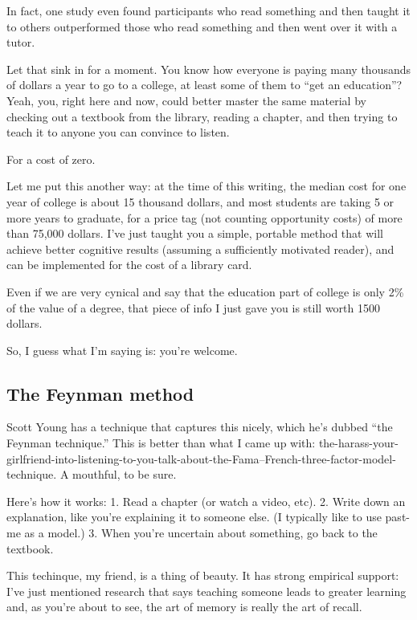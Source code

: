 In fact, one study even found participants who read something and then
taught it to others outperformed those who read something and then went
over it with a tutor.

Let that sink in for a moment. You know how everyone is paying many
thousands of dollars a year to go to a college, at least some of them to
``get an education''? Yeah, you, right here and now, could better master
the same material by checking out a textbook from the library, reading a
chapter, and then trying to teach it to anyone you can convince to
listen.

For a cost of zero.

Let me put this another way: at the time of this writing, the median
cost for one year of college is about 15 thousand dollars, and most
students are taking 5 or more years to graduate, for a price tag (not
counting opportunity costs) of more than 75,000 dollars. I've just
taught you a simple, portable method that will achieve better cognitive
results (assuming a sufficiently motivated reader), and can be
implemented for the cost of a library card.

Even if we are very cynical and say that the education part of college
is only 2\% of the value of a degree, that piece of info I just gave you
is still worth 1500 dollars.

So, I guess what I'm saying is: you're welcome.

\subsection{The Feynman method}\label{the-feynman-method}

Scott Young has a technique that captures this nicely, which he's dubbed
``the Feynman technique.'' This is better than what I came up with:
the-harass-your-girlfriend-into-listening-to-you-talk-about-the-Fama--French-three-factor-model-technique.
A mouthful, to be sure.

Here's how it works: 1. Read a chapter (or watch a video, etc). 2. Write
down an explanation, like you're explaining it to someone else. (I
typically like to use past-me as a model.) 3. When you're uncertain
about something, go back to the textbook.

This techinque, my friend, is a thing of beauty. It has strong empirical
support: I've just mentioned research that says teaching someone leads
to greater learning and, as you're about to see, the art of memory is
really the art of recall.

